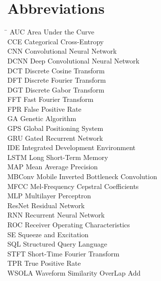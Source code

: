 \chapter*{Abbreviations}
\begin{tabbing}
    \hspace{50mm}\=\kill
    AUC \> Area Under the Curve \\
    CCE \> Categorical Cross-Entropy \\
    CNN \> Convolutional Neural Network\\
    DCNN \> Deep Convolutional Neural Network\\
    DCT \> Discrete Cosine Transform\\
    DFT \> Discrete Fourier Transform\\
    DGT \> Discrete Gabor Transform\\
    FFT \> Fast Fourier Transform \\
    FPR \> False Positive Rate \\
    GA \> Genetic Algorithm\\ 
    GPS \> Global Positioning System\\
    GRU \> Gated Recurrent Network\\
    IDE \> Integrated Development Environment \\
    LSTM \> Long Short-Term Memory\\
    MAP \> Mean Average Precision\\
    MBConv \> Mobile Inverted Bottleneck Convolution\\
    MFCC \> Mel-Frequency Cepstral Coefficients\\
    MLP \> Multilayer Perceptron\\ 
    ResNet \> Residual Network\\
    RNN \> Recurrent Neural Network\\
    ROC \> Receiver Operating Characteristics\\ 
    SE \> Squeeze and Excitation \\
    SQL \> Structured Query Language\\
    STFT \> Short-Time Fourier Transform\\
    TPR \> True Positive Rate \\
    WSOLA \> Waveform Similarity OverLap Add\\
    
\end{tabbing}


\newpage
{}

